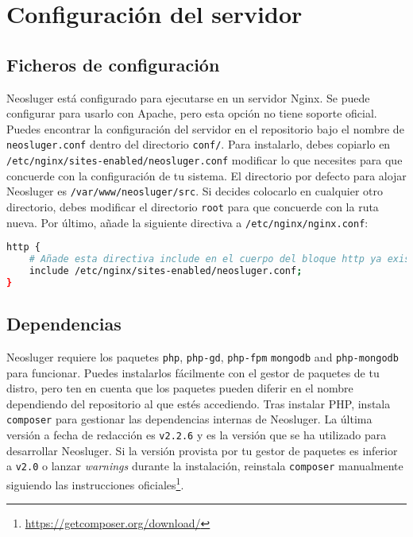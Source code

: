 \chapter{Configuración del servidor}\label{configuracion-del-servidor}

\section{Ficheros de configuración}\label{ficheros-de-configuracion}

Neosluger está configurado para ejecutarse en un servidor Nginx.
Se puede configurar para usarlo con Apache, pero esta opción no tiene soporte oficial.
Puedes encontrar la configuración del servidor en el repositorio bajo el nombre de \texttt{neosluger.conf} dentro del directorio \texttt{conf/}.
Para instalarlo, debes copiarlo en \texttt{/etc/nginx/sites-enabled/neosluger.conf} modificar lo que necesites para que concuerde con la configuración de tu sistema.
El directorio por defecto para alojar Neosluger es \texttt{/var/www/neosluger/src}.
Si decides colocarlo en cualquier otro directorio, debes modificar el directorio \texttt{root} para que concuerde con la ruta nueva.
Por último, añade la siguiente directiva a \texttt{/etc/nginx/nginx.conf}:

\begin{lstlisting}[language=sh]
http {
	# Añade esta directiva include en el cuerpo del bloque http ya existente:
	include /etc/nginx/sites-enabled/neosluger.conf;
}
\end{lstlisting}


\section{Dependencias}\label{dependencias}

Neosluger requiere los paquetes \texttt{php}, \texttt{php-gd}, \texttt{php-fpm} \texttt{mongodb} and \texttt{php-mongodb} para funcionar.
Puedes instalarlos fácilmente con el gestor de paquetes de tu distro, pero ten en cuenta que los paquetes pueden diferir en el nombre dependiendo del repositorio al que estés accediendo.
Tras instalar PHP, instala \texttt{composer} para gestionar las dependencias internas de Neosluger.
La última versión a fecha de redacción es \texttt{v2.2.6} y es la versión que se ha utilizado para desarrollar Neosluger.
Si la versión provista por tu gestor de paquetes es inferior a \texttt{v2.0} o lanzar \textit{warnings} durante la instalación, reinstala \texttt{composer} manualmente siguiendo las instrucciones oficiales\footnote{
	\url{https://getcomposer.org/download/}
}.

